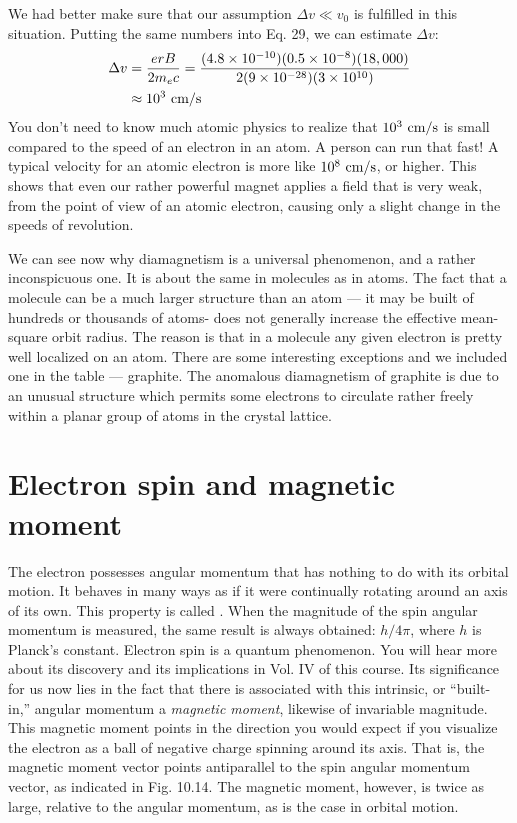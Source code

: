 We had better make sure that our assumption $\Delta v\ll v_0$ is fulfilled
in this situation. Putting the same numbers into Eq. 29, we can
estimate $\Delta v$:
\begin{align}
\begin{split}
  \Delta v &= \frac{erB}{2m_ec} = \frac{(4.8\times10^{-10})(0.5\times10^{-8})(18,000)}
                   {2(9\times10^{-28})(3\times10^{10})} \\
           &\approx 10^3\ \textup{cm}/\textup{s}
\end{split}
\end{align}
You don't need to know much atomic physics to realize that
$10^3\ \textup{cm}/\textup{s}$ is small compared to the speed of an electron in an atom.
A person can run that fast! A typical velocity for an atomic electron
is more like $10^8\ \textup{cm}/\textup{s}$, or higher. This shows that even our rather
powerful magnet applies a field that is very weak, from the point of
view of an atomic electron, causing only a slight change in the speeds
of revolution.


We can see now why diamagnetism is a universal phenomenon,
and a rather inconspicuous one. It is about the same in molecules
as in atoms. The fact that a molecule can be a much larger structure
than an atom --- it may be built of hundreds or thousands of atoms-
does not generally increase the effective mean-square orbit radius.
The reason is that in a molecule any given electron is pretty well
localized on an atom. There are some interesting exceptions and
we included one in the table --- graphite. The anomalous 
diamagnetism of graphite is due to an unusual structure which permits some
electrons to circulate rather freely within a planar group of atoms
in the crystal lattice.

\section{Electron spin and magnetic moment}

The electron possesses angular momentum that has nothing to
do with its orbital motion. It behaves in many ways as if it were
continually rotating around an axis of its own. This property is
called . When the magnitude of the spin angular momentum
is measured, the same result is always obtained: $h/4\pi$, where $h$ is
Planck's constant. Electron spin is a quantum phenomenon. You
will hear more about its discovery and its implications in Vol. IV of
this course. Its significance for us now lies in the fact that there is
associated with this intrinsic, or ``built-in,'' angular momentum a
\emph{magnetic moment}, likewise of invariable magnitude. This magnetic
moment points in the direction you would expect if you visualize
the electron as a ball of negative charge spinning around its axis.
That is, the magnetic moment vector points antiparallel to the spin
angular momentum vector, as indicated in Fig. 10.14. The magnetic
moment, however, is twice as large, relative to the angular 
momentum, as is the case in orbital motion.

